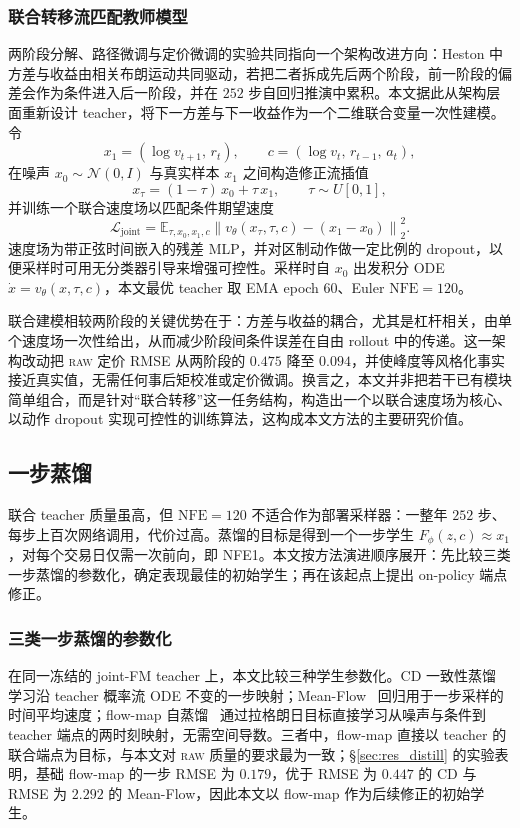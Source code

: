 \documentclass[11pt]{ctexart}
\newcommand{\raw}{\textsc{raw}}
\newcommand{\E}{\mathbb{E}}
\newcommand{\nfe}{\mathrm{NFE}}
\begin{document}
\subsubsection{联合转移流匹配教师模型}
\label{sec:jointfm}
两阶段分解、路径微调与定价微调的实验共同指向一个架构改进方向：Heston 中方差与收益由相关布朗运动共同驱动，若把二者拆成先后两个阶段，前一阶段的偏差会作为条件进入后一阶段，并在 $252$ 步自回归推演中累积。本文据此从架构层面重新设计 teacher，将下一方差与下一收益作为一个二维联合变量一次性建模。令
\[
x_1 = (\log v_{t+1},\, r_t), \qquad c=(\log v_t,\,r_{t-1},\,a_t),
\]
在噪声 $x_0\sim\mathcal N(0,I)$ 与真实样本 $x_1$ 之间构造修正流插值~\citep{lipman2023flow,liu2023rectified,albergo2023stochastic}
\[
x_\tau=(1-\tau)\,x_0+\tau\,x_1,\qquad \tau\sim U[0,1],
\]
并训练一个联合速度场以匹配条件期望速度
\begin{equation}
\mathcal L_{\mathrm{joint}}
=\E_{\tau,x_0,x_1,c}
\left\|v_\theta(x_\tau,\tau,c)-(x_1-x_0)\right\|_2^2 .
\end{equation}
速度场为带正弦时间嵌入的残差 MLP，并对区制动作做一定比例的 dropout，以便采样时可用无分类器引导来增强可控性。采样时自 $x_0$ 出发积分 ODE $\dot x=v_\theta(x,\tau,c)$，本文最优 teacher 取 EMA epoch 60、Euler $\nfe{=}120$。

联合建模相较两阶段的关键优势在于：方差与收益的耦合，尤其是杠杆相关，由单个速度场一次性给出，从而减少阶段间条件误差在自由 rollout 中的传递。这一架构改动把 \raw{} 定价 RMSE 从两阶段的 $0.475$ 降至 $0.094$，并使峰度等风格化事实接近真实值，无需任何事后矩校准或定价微调。换言之，本文并非把若干已有模块简单组合，而是针对“联合转移”这一任务结构，构造出一个以联合速度场为核心、以动作 dropout 实现可控性的训练算法，这构成本文方法的主要研究价值。

\subsection{一步蒸馏}
\label{sec:distill}
联合 teacher 质量虽高，但 $\nfe{=}120$ 不适合作为部署采样器：一整年 $252$ 步、每步上百次网络调用，代价过高。蒸馏的目标是得到一个一步学生 $F_\phi(z,c)\approx x_1$，对每个交易日仅需一次前向，即 NFE1。本文按方法演进顺序展开：先比较三类一步蒸馏的参数化，确定表现最佳的初始学生；再在该起点上提出 on-policy 端点修正。

\subsubsection{三类一步蒸馏的参数化}
\label{sec:distillfamily}
在同一冻结的 joint-FM teacher 上，本文比较三种学生参数化。CD 一致性蒸馏~\citep{song2023consistency,song2024improved} 学习沿 teacher 概率流 ODE 不变的一步映射；Mean-Flow~\citep{geng2025meanflow} 回归用于一步采样的时间平均速度；flow-map 自蒸馏~\citep{boffi2025flowmaps} 通过拉格朗日目标直接学习从噪声与条件到 teacher 端点的两时刻映射，无需空间导数。三者中，flow-map 直接以 teacher 的联合端点为目标，与本文对 \raw{} 质量的要求最为一致；\S\ref{sec:res_distill} 的实验表明，基础 flow-map 的一步 RMSE 为 $0.179$，优于 RMSE 为 $0.447$ 的 CD 与 RMSE 为 $2.292$ 的 Mean-Flow，因此本文以 flow-map 作为后续修正的初始学生。
\end{document}
